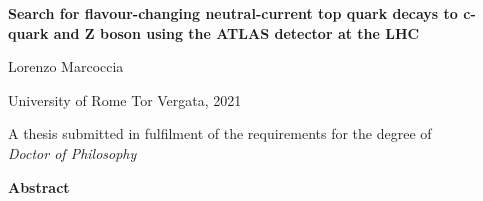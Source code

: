 
\thispagestyle{plain}
\begin{center}
	
	\Large
	\textbf{
		\newline
		\newline
		Search for flavour-changing neutral-current top quark decays to c-quark and Z boson using the ATLAS detector at the LHC}
		
	\vspace{0.5cm}
	\large{Lorenzo Marcoccia}
	
	\vspace{0.3cm}
	\large 
	University of Rome Tor Vergata, 2021
	
	\vspace{0.3cm}
	\normalsize 
	A thesis submitted in fulfilment of the requirements for the degree of\\
	 \textit{Doctor of Philosophy}
	
	\vspace{0.9cm}
	\large
	\textbf{Abstract}
	\vspace{0.3cm}
	
\end{center}
